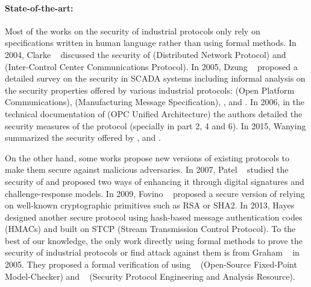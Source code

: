 \paragraph{State-of-the-art:}\label{sec:intro_sota}

Most of the works on the security of industrial protocols only rely on
specifications written in human language rather than using formal methods.
In 2004, Clarke \etal~\cite{CR04} discussed the security of \dnp
(Distributed Network Protocol) and \iccp (Inter-Control Center Communications
Protocol).
In 2005, Dzung \etal~\cite{DNHC05} proposed a detailed survey on the security in
SCADA systems including informal analysis on the security properties offered by
various industrial protocols: \opc (Open Platform Communications),
\mms (Manufacturing Message Specification),
, \iccp and \etherip.
In 2006, in the technical documentation of \opcua (OPC Unified Architecture) the
authors detailed the security measures of the protocol (specially in part 2, 4
and 6).
In 2015, Wanying \etal summarized the security offered by \modbus, \dnp and
\opcua.

On the other hand, some works propose new versions of existing protocols to make
them secure against malicious adversaries.
In 2007, Patel \etal~\cite{PY07} studied the security of \dnp and proposed two
ways of enhancing it through digital signatures and challenge-response models.
In 2009, Fovino \etal~\cite{FCMT09} proposed a secure version of \modbus
relying on well-known cryptographic primitives such as RSA or SHA2.
In 2013, Hayes \etal~\cite{HE13} designed another secure \modbus protocol using
hash-based message authentication codes (HMACs) and built on STCP (Stream
Transmission Control Protocol).
%
To the best of our knowledge, the only work directly using formal
methods to prove the security of industrial protocols or find attack
against them is from Graham \etal~\cite{GP05} in 2005.  They proposed
a formal verification of \dnp using \ofmc~\cite{BMV03} (Open-Source
Fixed-Point Model-Checker) and
\spear~\cite{SH01} (Security Protocol Engineering and Analysis Resource).

